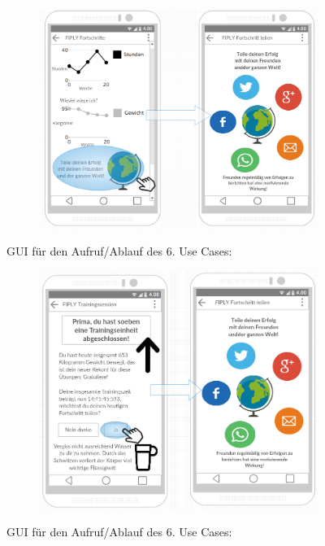 \documentclass[FIPLY_base.tex]{subfiles}
\begin{document}
	\begin{figure}[H]
		\begin{subfigure}[b]{0.3\textwidth}
			\includegraphics[scale=0.32]{img/Fortschrittteilen1}
		\end{subfigure}
		\caption{GUI für den Aufruf/Ablauf des 6. Use Cases:}
	\end{figure}
	\begin{figure}[H]
		\begin{subfigure}[b]{0.3\textwidth}
			\includegraphics[scale=0.32]{img/Fortschrittteilen2}
		\end{subfigure}
		\caption{GUI für den Aufruf/Ablauf des 6. Use Cases:}
	\end{figure}
	
\end{document}
